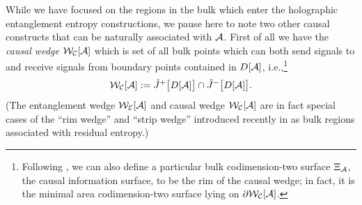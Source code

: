 \documentclass[12pt]{article}
\def\bulkJ{{\tilde J}}
\def\regA{{\cal A}}
\def\domdA{D[\regA]}
\def\CIS{{\Xi_\regA}}
\def\CWA{{\cal W}_{\cal C}[\regA]}
\def\EWA{{\cal W}_{\cal E}[\regA]}
\begin{document}
While we have focused on the regions in the bulk which enter the holographic entanglement entropy constructions, we pause here to note two other causal constructs that can be naturally associated with $\regA$. First of all we have the {\em causal wedge} $\CWA$ which is set of all bulk points which can both send signals to and receive signals from boundary points contained in $\domdA$, i.e.,\footnote{ Following \cite{Hubeny:2012wa}, we can also define a particular bulk codimension-two surface $\CIS$, the causal information surface, to be the rim of the causal wedge; in fact, it is the minimal area codimension-two surface lying on $\partial\CWA$. 
}
%
\begin{equation}
\CWA := \bulkJ^+\big[\domdA\big] \cap \bulkJ^- \big[\domdA\big].
\label{cwedge}
\end{equation}	
%
(The entanglement wedge $\EWA$ and causal wedge $\CWA$ are in fact special cases of the ``rim wedge'' and ``strip wedge'' introduced recently in \cite{Hubeny:2014qwa} as bulk regions associated with residual entropy.)
\end{document}
